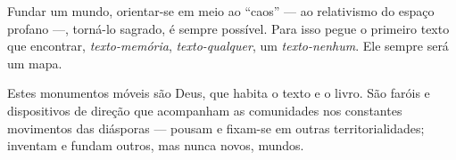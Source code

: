 \begin{center}\end{center}

\noindent{}Fundar um mundo, orientar-se em meio ao ``caos'' --- ao relativismo do
espaço profano ---, torná-lo sagrado, é sempre possível. Para isso pegue
o primeiro texto que encontrar, \emph{texto-memória},
\emph{texto-qualquer}, um \emph{texto-nenhum}. Ele sempre será um mapa.

Estes monumentos móveis são Deus, que habita o texto e o livro. São
faróis e dispositivos de direção que acompanham as comunidades nos
constantes movimentos das diásporas --- pousam e fixam-se em outras
territorialidades; inventam e fundam outros, mas nunca novos, mundos.